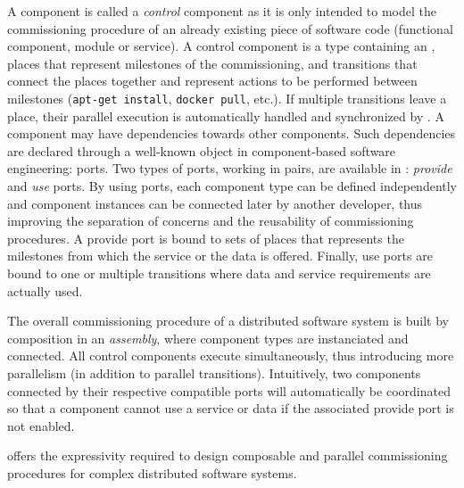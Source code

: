 A \mad component is called a \emph{control} component as it is only
intended to model the commissioning procedure of an already existing
piece of software code (functional component, module or service). A
\mad control component is a type containing an \net, \ie places that
represent milestones of the commissioning, and transitions that
connect the places together and represent actions to be performed
between milestones (\eg \texttt{apt-get install}, \texttt{docker
  pull}, etc.). If multiple transitions leave a place, their parallel
execution is automatically handled and synchronized by \mad. A
component may have dependencies towards other components. Such
dependencies are declared through a well-known object in
component-based software engineering: ports. Two types of ports,
working in pairs, are available in \mad: \emph{provide} and \emph{use}
ports. By using ports, each component type can be defined
independently and component instances can be connected later by
another developer, thus improving the separation of concerns and the
reusability of commissioning procedures. A provide port is bound to
sets of places that represents the milestones from which the service
or the data is offered. Finally, use ports are bound to one or
multiple transitions where data and service requirements are actually
used.

The overall commissioning procedure of a distributed software system
is built by composition in an \emph{assembly}, where component
types are instanciated and connected. All control components execute
simultaneously, thus introducing more parallelism (in addition to
parallel transitions). Intuitively, two components connected by their
respective compatible ports will automatically be coordinated so
that a component cannot use a service or data if the associated
provide port is not enabled.

\mad offers the expressivity required to design composable and parallel
commissioning procedures for complex distributed software systems.

